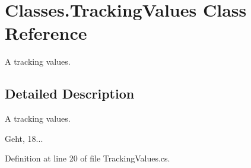 \section{Classes.\-Tracking\-Values Class Reference}
\label{class_classes_1_1_tracking_values}


A tracking values.  




\subsection{Detailed Description}
A tracking values. 

Geht, 18... 

Definition at line 20 of file Tracking\-Values.\-cs.

